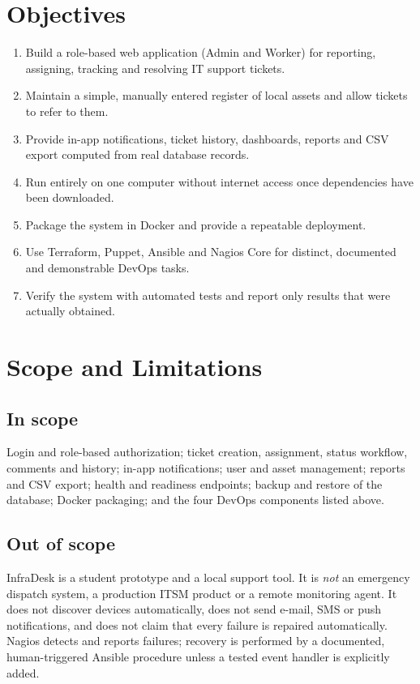 \documentclass[12pt,a4paper]{article}
\begin{document}
\section{Objectives}
\begin{enumerate}[leftmargin=*]
  \item Build a role-based web application (Admin and Worker) for reporting, assigning, tracking and resolving IT support tickets.
  \item Maintain a simple, manually entered register of local assets and allow tickets to refer to them.
  \item Provide in-app notifications, ticket history, dashboards, reports and CSV export computed from real database records.
  \item Run entirely on one computer without internet access once dependencies have been downloaded.
  \item Package the system in Docker and provide a repeatable deployment.
  \item Use Terraform, Puppet, Ansible and Nagios Core for distinct, documented and demonstrable DevOps tasks.
  \item Verify the system with automated tests and report only results that were actually obtained.
\end{enumerate}

\section{Scope and Limitations}
\subsection{In scope}
Login and role-based authorization; ticket creation, assignment, status workflow, comments and history; in-app notifications; user and asset management; reports and CSV export; health and readiness endpoints; backup and restore of the database; Docker packaging; and the four DevOps components listed above.

\subsection{Out of scope}
InfraDesk is a student prototype and a local support tool. It is \emph{not} an emergency dispatch system, a production ITSM product or a remote monitoring agent. It does not discover devices automatically, does not send e-mail, SMS or push notifications, and does not claim that every failure is repaired automatically. Nagios detects and reports failures; recovery is performed by a documented, human-triggered Ansible procedure unless a tested event handler is explicitly added.
\end{document}
